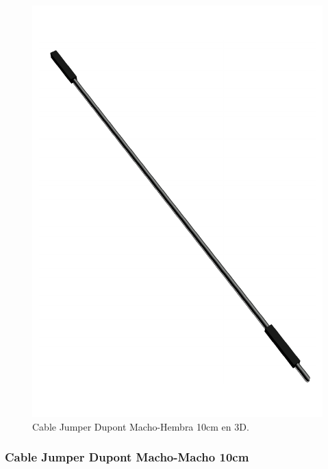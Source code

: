     \begin{figure}[H]
        \centering
        \includegraphics[scale=0.4]{15/img/cableJumperMHModelo.pdf}
        \caption{Cable Jumper Dupont Macho-Hembra 10cm en 3D.}
        \label{fig:cableJumperMHModelo}
    \end{figure}
    
    \subsubsection{Cable Jumper Dupont Macho-Macho 10cm}
    
    
    
